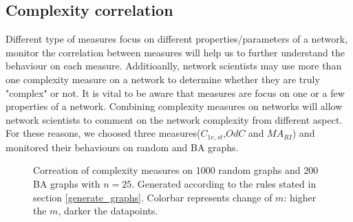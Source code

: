 \documentclass[12pt]{article}
\begin{document}
\subsection{Complexity correlation}
Different type of measures focus on different properties/parameters of a network, monitor the correlation between measures will help us to further understand the behaviour on each measure. Additioanlly, network scientists may use more than one complexity measure on a network to determine whether they are truly "complex" or not. It is vital to be aware that measures are focus on one or a few properties of a network. Combining complexity measures on networks will allow network scientists to comment on the network complexity from different aspect. For these reasons, we choosed three measures($C_{1e,st}$,$OdC$ and $MA_{RI}$) and monitored their behaviours on random and BA graphs.\\
\begin{figure}[h!]
    \caption{Correation of complexity measures on 1000 random graphs and 200 BA graphs with $n=25$. Generated according to the rules stated in section \ref{generate_graphs}. Colorbar represents change of $m$: higher the $m$, darker the datapoints.}
    \label{fig:correlation}
\end{figure}
\end{document}
